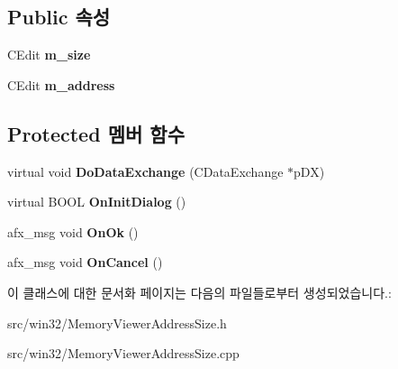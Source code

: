 \subsection*{Public 속성}
\begin{DoxyCompactItemize}
\item 
\mbox{\label{class_memory_viewer_address_size_a02bf9c56d2fe4c0edb66f6f26323378e}} 
C\+Edit {\bfseries m\+\_\+size}
\item 
\mbox{\label{class_memory_viewer_address_size_a91998e945a9ebfc2dd2636f75e89d974}} 
C\+Edit {\bfseries m\+\_\+address}
\end{DoxyCompactItemize}
\subsection*{Protected 멤버 함수}
\begin{DoxyCompactItemize}
\item 
\mbox{\label{class_memory_viewer_address_size_a5b80a5682982a31e25469c1ba9d75ee8}} 
virtual void {\bfseries Do\+Data\+Exchange} (C\+Data\+Exchange $\ast$p\+DX)
\item 
\mbox{\label{class_memory_viewer_address_size_a986a62d4477f5c2b6d227386803a6b5e}} 
virtual B\+O\+OL {\bfseries On\+Init\+Dialog} ()
\item 
\mbox{\label{class_memory_viewer_address_size_acc7b79baafb3ae6fad9b4ca0b12aa34f}} 
afx\+\_\+msg void {\bfseries On\+Ok} ()
\item 
\mbox{\label{class_memory_viewer_address_size_af05210504fe10d13c328d7d953da28d8}} 
afx\+\_\+msg void {\bfseries On\+Cancel} ()
\end{DoxyCompactItemize}


이 클래스에 대한 문서화 페이지는 다음의 파일들로부터 생성되었습니다.\+:\begin{DoxyCompactItemize}
\item 
src/win32/Memory\+Viewer\+Address\+Size.\+h\item 
src/win32/Memory\+Viewer\+Address\+Size.\+cpp\end{DoxyCompactItemize}

